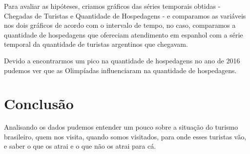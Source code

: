 \documentclass[review]{elsarticle}
\begin{document}
Para avaliar as hipóteses, criamos gráficos das séries temporais obtidas - Chegadas de Turistas e Quantidade de Hospedagens - e comparamos as variáveis nos dois gráficos de acordo com o intervalo de tempo, no caso, comparamos a quantidade de hospedagens que ofereciam atendimento em espanhol com a série temporal da quantidade de turistas argentinos que chegavam.

Devido a encontrarmos um pico na quantidade de hospedagens no ano de 2016 pudemos ver que as Olimpíadas influenciaram na quantidade de hospedagens.

\section{Conclusão}
Analisando os dados pudemos entender um pouco sobre a situação do turismo brasileiro, quem nos visita, quando somos visitados, para onde esses turistas vão, e saber o que os atrai e o que não os atrai para cá.
\end{document}
